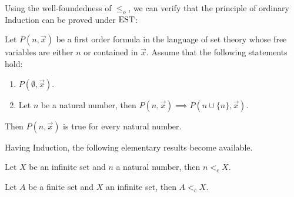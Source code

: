 Using the well-foundedness of $\leq_o$, we can verify that the principle of
ordinary Induction can be proved under $\mathrm{EST}$:
\begin{theorem}
	Let $P(n,\vec{x})$ be a first order formula in the language of set theory whose free variables are either $n$ or contained in $\vec{x}$. Assume that the following statements hold:
	\begin{enumerate}
		\item $P(\emptyset,\vec{x})$.
		\item\label{inductive} Let $n$ be a natural number, then $P(n,\vec{x}) \implies P(n\cup \{n\},\vec{x})$.
	\end{enumerate}
	Then $P(n,\vec{x})$ is true for every natural number.
\end{theorem}
Having Induction, the following elementary results become available.
\begin{lemma}
	Let $X$ be an infinite set and $n$ a natural number, then $n <_c X$.
\end{lemma}

\begin{corollary}\label{cor:finite-smaller-infinite}
	Let $A$ be a finite set and $X$ an infinite set, then $A <_c X$.
\end{corollary}

